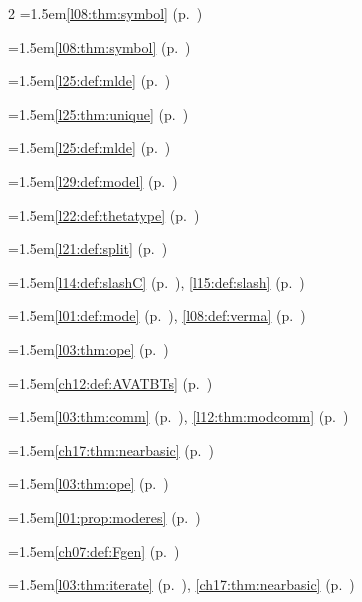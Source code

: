 \begin{multicols}{2}
\hangindent=1.5em\quad \ref{l08:thm:symbol} (p.~\pageref{l08:thm:symbol})\par
\hangindent=1.5em\quad \ref{l08:thm:symbol} (p.~\pageref{l08:thm:symbol})\par
\hangindent=1.5em\quad \ref{l25:def:mlde} (p.~\pageref{l25:def:mlde})\par
\hangindent=1.5em\quad \ref{l25:thm:unique} (p.~\pageref{l25:thm:unique})\par
\hangindent=1.5em\quad \ref{l25:def:mlde} (p.~\pageref{l25:def:mlde})\par
\hangindent=1.5em\quad \ref{l29:def:model} (p.~\pageref{l29:def:model})\par
\hangindent=1.5em\quad \ref{l22:def:thetatype} (p.~\pageref{l22:def:thetatype})\par
\hangindent=1.5em\quad \ref{l21:def:split} (p.~\pageref{l21:def:split})\par
\hangindent=1.5em\quad \ref{l14:def:slashC} (p.~\pageref{l14:def:slashC}), \ref{l15:def:slash} (p.~\pageref{l15:def:slash})\par
\hangindent=1.5em\quad \ref{l01:def:mode} (p.~\pageref{l01:def:mode}), \ref{l08:def:verma} (p.~\pageref{l08:def:verma})\par
\hangindent=1.5em\quad \ref{l03:thm:ope} (p.~\pageref{l03:thm:ope})\par
\hangindent=1.5em\quad \ref{ch12:def:AVATBTs} (p.~\pageref{ch12:def:AVATBTs})\par
\hangindent=1.5em\quad \ref{l03:thm:comm} (p.~\pageref{l03:thm:comm}), \ref{l12:thm:modcomm} (p.~\pageref{l12:thm:modcomm})\par
\hangindent=1.5em\quad \ref{ch17:thm:nearbasic} (p.~\pageref{ch17:thm:nearbasic})\par
\hangindent=1.5em\quad \ref{l03:thm:ope} (p.~\pageref{l03:thm:ope})\par
\hangindent=1.5em\quad \ref{l01:prop:moderes} (p.~\pageref{l01:prop:moderes})\par
\hangindent=1.5em\quad \ref{ch07:def:Fgen} (p.~\pageref{ch07:def:Fgen})\par
\hangindent=1.5em\quad \ref{l03:thm:iterate} (p.~\pageref{l03:thm:iterate}), \ref{ch17:thm:nearbasic} (p.~\pageref{ch17:thm:nearbasic})\par

\end{multicols}
